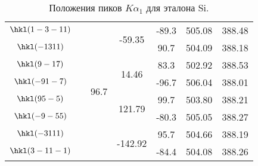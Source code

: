 \begin{table}[ht!]
\begin{tabular}{ |c|c|c|c|c|c|c| }
        $ \hkl(1 -3 -11)$ &                         &  \multirow{10}{*}{96.7} &  \multirow{2}{*}{-59.35} &               -89.3 &              505.08 &              388.48 \\
        $  \hkl(-1 3 11)$ &                         &                         &                          &                90.7 &              504.09 &              388.18 \\
        $   \hkl(9 -1 7)$ &                         &                         &   \multirow{2}{*}{14.46} &                83.3 &              502.92 &              388.53 \\
        $  \hkl(-9 1 -7)$ &                         &                         &                          &               -96.7 &              506.04 &              388.01 \\
        $   \hkl(9 5 -5)$ &                         &                         &  \multirow{2}{*}{121.79} &                99.7 &              503.80 &              388.21 \\
        $  \hkl(-9 -5 5)$ &                         &                         &                          &               -80.3 &              505.05 &              388.27 \\
        $  \hkl(-3 11 1)$ &                         &                         & \multirow{2}{*}{-142.92} &                95.7 &              504.66 &              388.19 \\
        $ \hkl(3 -11 -1)$ &                         &                         &                          &               -84.4 &              504.08 &              388.26 \\
        \hline
    \end{tabular}
    \caption{Положения пиков $K\alpha_1$ для эталона Si.}
    \label{tab:Si}
\end{table}
